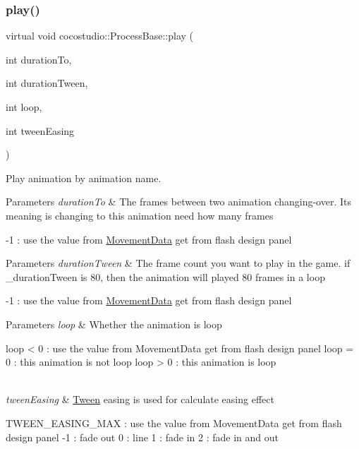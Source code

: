 \subsubsection{\texorpdfstring{play()}{play()}\hspace{0.1cm}{\footnotesize\ttfamily [2/2]}}
{\footnotesize\ttfamily virtual void cocostudio\+::\+Process\+Base\+::play (\begin{DoxyParamCaption}\item[{int}]{duration\+To,  }\item[{int}]{duration\+Tween,  }\item[{int}]{loop,  }\item[{int}]{tween\+Easing }\end{DoxyParamCaption})\hspace{0.3cm}{\ttfamily [virtual]}}

Play animation by animation name.


\begin{DoxyParams}{Parameters}
{\em duration\+To} & The frames between two animation changing-\/over. It\textquotesingle{}s meaning is changing to this animation need how many frames\\
\hline
\end{DoxyParams}
-\/1 \+: use the value from \hyperlink{classcocostudio_1_1MovementData}{Movement\+Data} get from flash design panel 
\begin{DoxyParams}{Parameters}
{\em duration\+Tween} & The frame count you want to play in the game. if \+\_\+duration\+Tween is 80, then the animation will played 80 frames in a loop\\
\hline
\end{DoxyParams}
-\/1 \+: use the value from \hyperlink{classcocostudio_1_1MovementData}{Movement\+Data} get from flash design panel


\begin{DoxyParams}{Parameters}
{\em loop} & Whether the animation is loop \begin{DoxyVerb}    loop < 0 : use the value from MovementData get from flash design panel
    loop = 0 : this animation is not loop
    loop > 0 : this animation is loop
\end{DoxyVerb}
\\
\hline
{\em tween\+Easing} & \hyperlink{classcocostudio_1_1Tween}{Tween} easing is used for calculate easing effect \begin{DoxyVerb}    TWEEN_EASING_MAX : use the value from MovementData get from flash design panel
    -1 : fade out
    0  : line
    1  : fade in
    2  : fade in and out\end{DoxyVerb}
 \\
\hline
\end{DoxyParams}
\mbox{\label{classcocostudio_1_1ProcessBase_a4e1927ae31e52d92b976b41229160f70}} 
